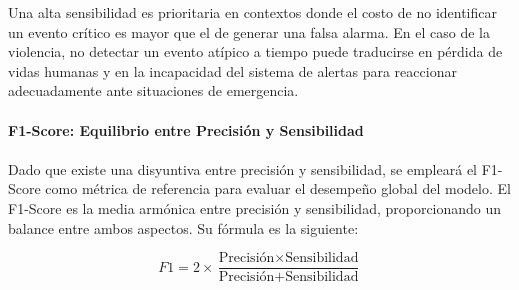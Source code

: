 Una alta sensibilidad es prioritaria en contextos donde el costo de no identificar un evento crítico es mayor que el de generar una falsa alarma. En el caso de la violencia, no detectar un evento atípico a tiempo puede traducirse en pérdida de vidas humanas y en la incapacidad del sistema de alertas para reaccionar adecuadamente ante situaciones de emergencia.
\\\\
\textbf{F1-Score: Equilibrio entre Precisión y Sensibilidad}
\\\\
Dado que existe una disyuntiva entre precisión y sensibilidad, se empleará el F1-Score como métrica de referencia para evaluar el desempeño global del modelo. El F1-Score es la media armónica entre precisión y sensibilidad, proporcionando un balance entre ambos aspectos. Su fórmula es la siguiente:

\begin{equation}
F1 = 2 \times \frac{\text{Precisión} \times \text{Sensibilidad}}{\text{Precisión} + \text{Sensibilidad}}
\end{equation}


